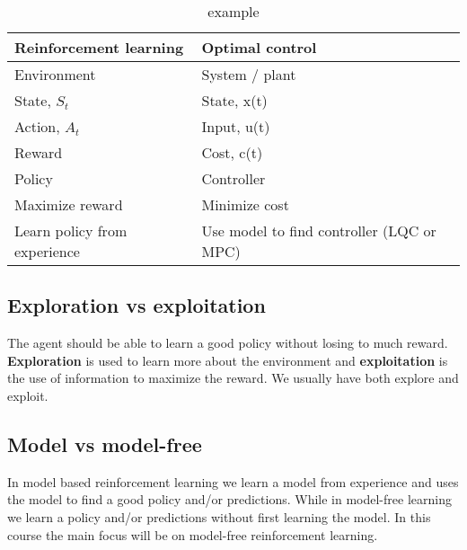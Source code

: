 \begin{table}[ht!]
\centering
\begin{tabular}{ll}
 \textbf{Reinforcement learning}&  \textbf{Optimal control}  \\ \hline
 Environment &  System / plant  \\
 State, $S_t$& State, x(t)  \\ 
 Action, $A_t$& Input, u(t)\\
Reward & Cost, c(t)\\
Policy & Controller \\
Maximize reward & Minimize cost\\
Learn policy from experience & Use model to find controller (LQC or MPC)\\ \hline
\end{tabular}
\caption{example}
\label{tab:tab1}
\end{table}

\subsection*{Exploration vs exploitation}
The agent should be able to learn a good policy without losing to much reward. \textbf{Exploration} is used to learn more about the environment and \textbf{exploitation} is the use of information to maximize the reward. We usually have both explore and exploit.


\subsection*{Model vs model-free}
In model based reinforcement learning we learn a model from experience and uses the model to find a good policy and/or predictions. While in model-free learning we learn a policy and/or predictions without first learning the model. In this course the main focus will be on model-free reinforcement learning.  







